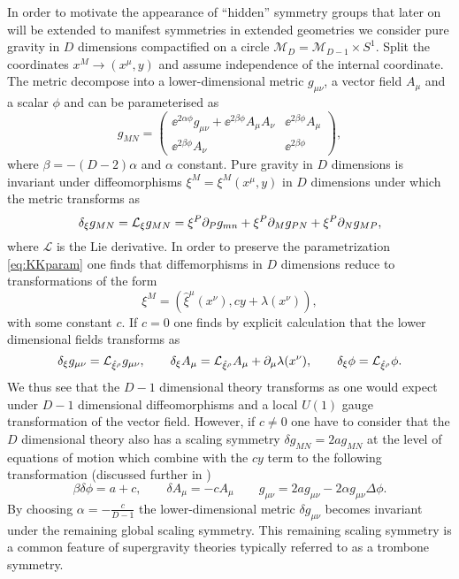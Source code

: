 In order to motivate the appearance of ``hidden'' symmetry groups that later on will be extended to manifest symmetries in extended geometries we consider pure gravity in $D$ dimensions compactified on a circle $\mathcal{M}_D = \mathcal{M}_{D-1}\times S^1$. Split the coordinates $x^M\to (x^\mu,y)$ and assume independence of the internal coordinate. The metric decompose into a lower-dimensional metric $g_{\mu\nu}$, a vector field $A_\mu$ and a scalar $\phi$ and can be parameterised as
\begin{equation}\label{eq:KKparam}
    g_{MN} = \left(\begin{array}{c|c}
                \ee^{2\alpha\phi}g_{\mu\nu}+\ee^{2\beta\phi}A_\mu A_\nu & \ee^{2\beta\phi}A_\mu\\\hline \ee^{2\beta\phi}A_\nu& \ee^{2\beta\phi}
             \end{array}\right),
\end{equation}
where $\beta=-(D-2)\alpha$ and $\alpha$ constant. Pure gravity in $D$ dimensions is invariant under diffeomorphisms $\xi^M=\xi^M(x^\mu,y)$ in $D$ dimensions under which the metric transforms as 
\begin{equation}
    \delta_\xi g_{MN} = \mathcal{L}_\xi g_{MN} = \xi^P\partial_Pg_{mn}+\xi^P\partial_{M}g_{PN}+\xi^P\partial_{N}g_{MP},
\end{equation}
where $\mathcal{L}$ is the Lie derivative. In order to preserve the parametrization \eqref{eq:KKparam} one finds that diffemorphisms in $D$ dimensions reduce to transformations of the form
\begin{equation}
    \xi^M = \left(\hat{\xi}^\mu(x^\nu),cy+\lambda(x^\nu)\right),
\end{equation}
with some constant $c$. If $c=0$ one finds by explicit calculation that the lower dimensional fields transforms as 
\begin{equation}
    \delta_\xi g_{\mu\nu} = \mathcal{L}_{\hat{\xi}^\rho}g_{\mu\nu},\qquad \delta_\xi A_\mu = \mathcal{L}_{\hat{\xi}^\rho}A_{\mu}+\partial_\mu\lambda(x^\nu), \qquad \delta_\xi \phi = \mathcal{L}_{\hat{\xi}^\rho}\phi.
\end{equation}
We thus see that the $D-1$ dimensional theory transforms as one would expect under $D-1$ dimensional diffeomorphisms and a local $U(1)$ gauge transformation of the vector field. However, if $c\neq 0$ one have to consider that the $D$ dimensional theory also has a scaling symmetry $\delta g_{MN}= 2ag_{MN}$ at the level of equations of motion which combine with the $cy$ term to the following transformation (discussed further in \cite{PopeKaluzaKlein})
\begin{equation}
    \beta \delta\phi = a+c,\qquad \delta A_\mu = -cA_\mu\qquad g_{\mu\nu} = 2ag_{\mu\nu}-2\alpha g_{\mu\nu}\Delta\phi.
\end{equation}
By choosing $\alpha = -\frac{c}{D-1}$ the lower-dimensional metric $\delta g_{\mu\nu}$ becomes invariant under the remaining global scaling symmetry. This remaining scaling symmetry is a common feature of supergravity theories typically referred to as a trombone symmetry. 

